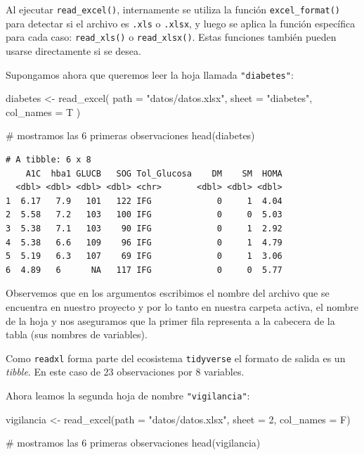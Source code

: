 \documentclass[
  spanish,
  a4paper,
]{scrbook}
\newenvironment{Shaded}{\begin{snugshade}}{\end{snugshade}}
\newcommand{\AttributeTok}[1]{\textcolor[rgb]{0.40,0.45,0.13}{#1}}
\newcommand{\CommentTok}[1]{\textcolor[rgb]{0.37,0.37,0.37}{#1}}
\newcommand{\DecValTok}[1]{\textcolor[rgb]{0.68,0.00,0.00}{#1}}
\newcommand{\FunctionTok}[1]{\textcolor[rgb]{0.28,0.35,0.67}{#1}}
\newcommand{\NormalTok}[1]{\textcolor[rgb]{0.00,0.23,0.31}{#1}}
\newcommand{\OtherTok}[1]{\textcolor[rgb]{0.00,0.23,0.31}{#1}}
\newcommand{\StringTok}[1]{\textcolor[rgb]{0.13,0.47,0.30}{#1}}
\begin{document}
Al ejecutar \texttt{read\_excel()}, internamente se utiliza la función
\texttt{excel\_format()} para detectar si el archivo es \texttt{.xls} o
\texttt{.xlsx}, y luego se aplica la función específica para cada caso:
\texttt{read\_xls()} o \texttt{read\_xlsx()}. Estas funciones también
pueden usarse directamente si se desea.

Supongamos ahora que queremos leer la hoja llamada \texttt{"diabetes"}:

\begin{Shaded}
\begin{Highlighting}[]
\NormalTok{diabetes }\OtherTok{\textless{}{-}} \FunctionTok{read\_excel}\NormalTok{(}
  \AttributeTok{path =} \StringTok{"datos/datos.xlsx"}\NormalTok{,}
  \AttributeTok{sheet =} \StringTok{"diabetes"}\NormalTok{,}
  \AttributeTok{col\_names =}\NormalTok{ T}
\NormalTok{)}

\CommentTok{\# mostramos las 6 primeras observaciones}
\FunctionTok{head}\NormalTok{(diabetes)}
\end{Highlighting}
\end{Shaded}

\begin{verbatim}
# A tibble: 6 x 8
    A1C  hba1 GLUCB   SOG Tol_Glucosa    DM    SM  HOMA
  <dbl> <dbl> <dbl> <dbl> <chr>       <dbl> <dbl> <dbl>
1  6.17   7.9   101   122 IFG             0     1  4.04
2  5.58   7.2   103   100 IFG             0     0  5.03
3  5.38   7.1   103    90 IFG             0     1  2.92
4  5.38   6.6   109    96 IFG             0     1  4.79
5  5.19   6.3   107    69 IFG             0     1  3.06
6  4.89   6      NA   117 IFG             0     0  5.77
\end{verbatim}

Observemos que en los argumentos escribimos el nombre del archivo que se
encuentra en nuestro proyecto y por lo tanto en nuestra carpeta activa,
el nombre de la hoja y nos aseguramos que la primer fila representa a la
cabecera de la tabla (sus nombres de variables).

Como \texttt{readxl} forma parte del ecosistema \texttt{tidyverse} el
formato de salida es un \emph{tibble}. En este caso de 23 observaciones
por 8 variables.

Ahora leamos la segunda hoja de nombre \texttt{"vigilancia"}:

\begin{Shaded}
\begin{Highlighting}[]
\NormalTok{vigilancia }\OtherTok{\textless{}{-}} \FunctionTok{read\_excel}\NormalTok{(}\AttributeTok{path =} \StringTok{"datos/datos.xlsx"}\NormalTok{, }\AttributeTok{sheet =} \DecValTok{2}\NormalTok{, }\AttributeTok{col\_names =}\NormalTok{ F)}

\CommentTok{\# mostramos las 6 primeras observaciones}
\FunctionTok{head}\NormalTok{(vigilancia)}
\end{Highlighting}
\end{Shaded}
\end{document}
